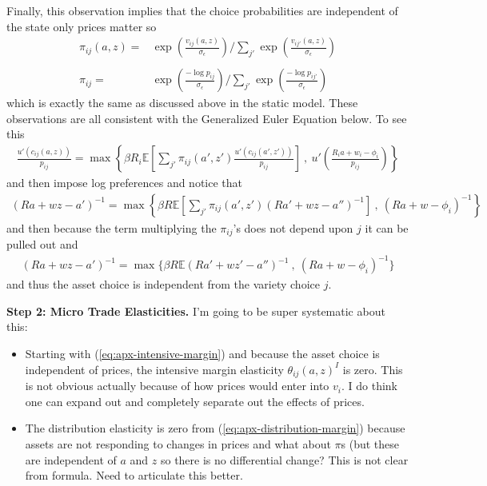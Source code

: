 \documentclass[12pt,pdftex]{article}
\begin{document}
\begin{onehalfspacing}
Finally, this observation implies that the choice probabilities are independent of the state only prices matter so
\begin{align}
\pi_{ij}(a, z) = & \exp \left( \frac{ v_{ij}(a, z) }{\sigma_{\epsilon}} \right) \Bigg / \sum_{j'} \exp \left( \frac{ v_{ij'}(a, z ) }{\sigma_{\epsilon}} \right) \\
\nonumber\\
\pi_{ij} = & \exp \left( \frac{  -\log p_{ij} }{\sigma_{\epsilon}} \right) \Bigg / \sum_{j'} \exp \left( \frac{ -\log p_{ij'} }{\sigma_{\epsilon}} \right)
\end{align}
which is exactly the same as discussed above in the static model. These observations are all consistent with the Generalized Euler Equation below. To see this
\begin{align}
\frac{u'(c_{ij}(a, z))}{p_{ij}} = \max \left\{ \beta R_{i} \mathbb{E} \left[ \sum_{j'} \pi_{ij}(a', z') \frac{u'(c_{ij}(a', z'))}{p_{ij}} \right] \ , \  u' \left( \frac{R_i a + w_i - \phi_{i}}{p_{ij}} \right) \right \}
\end{align}
and then impose log preferences and notice that
\begin{align}
(Ra + wz - a')^{-1} = \max \left\{ \beta R \mathbb{E} \left[ \sum_{j'} \pi_{ij}(a', z') (Ra' + wz - a'')^{-1} \right] \ , \   (R a + w - \phi_{i})^{-1} \right \}
\end{align}
and then because the term multiplying the $\pi_{ij}$'s does not depend upon $j$ it can be pulled out and
\begin{align}
(Ra + wz - a')^{-1} = \max \bigg \{ \beta R \mathbb{E} (Ra' + wz' - a'')^{-1}  \ , \   (R a + w - \phi_{i})^{-1}  \bigg \}
\end{align}
and thus the asset choice is independent from the variety choice $j$.

\textbf{Step 2: Micro Trade Elasticities.} I'm going to be super systematic about this:
\begin{itemize}
\item Starting with (\ref{eq:apx-intensive-margin}) and because the asset choice is independent of prices,  the intensive margin elasticity $\theta_{ij}(a,z)^I$ is zero. This is not obvious actually because of how prices would enter into $v_{i}$. I do think one can expand out and completely separate out the effects of prices.

\item The distribution elasticity is zero from (\ref{eq:apx-distribution-margin}) because assets are not responding to changes in prices and what about $\pi$s (but these are independent of $a$ and $z$ so there is no differential change? This is not clear from formula. Need to articulate this better.


\end{itemize}
\end{onehalfspacing}
\end{document}
